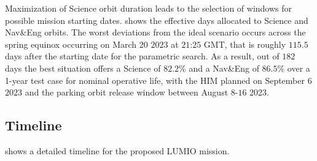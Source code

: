 Maximization of Science orbit duration leads to the selection of windows for possible mission starting dates.  shows the effective days allocated to Science and Nav\&Eng orbits. The worst deviations from the ideal scenario occurs across the spring equinox occurring on March $20$ $2023$ at $21$:$25$ GMT, that is roughly $115.5$ days after the starting date for the parametric search. As a result, out of $182$ days the best situation offers a Science of $82.2\%$ and a Nav\&Eng of $86.5\%$ over a 1-year test case for nominal operative life, with the {HIM} planned on September $6$ $2023$ and the parking orbit release window between August $8$-$16$ 2023. 

\subsection{Timeline}
 shows a detailed timeline for the proposed LUMIO mission.


